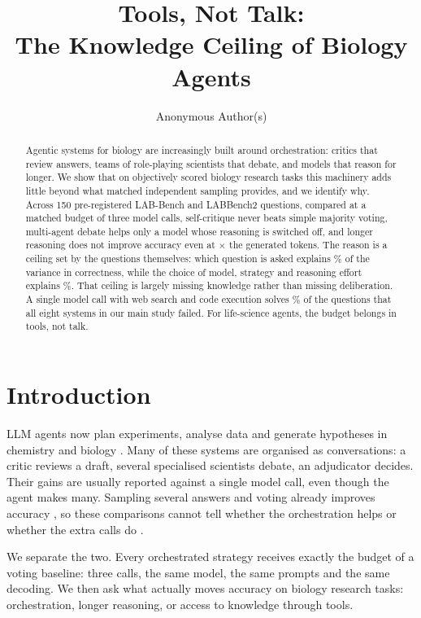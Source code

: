 \documentclass{article}
\title{Tools, Not Talk:\\The Knowledge Ceiling of Biology Agents}
\author{Anonymous Author(s)}
\begin{document}
\maketitle

\begin{abstract}
Agentic systems for biology are increasingly built around orchestration: critics that review answers, teams of role-playing scientists that debate, and models that reason for longer.
We show that on objectively scored biology research tasks this machinery adds little beyond what matched independent sampling provides, and we identify why.
Across 150 pre-registered LAB-Bench and LABBench2 questions, compared at a matched budget of three model calls, self-critique never beats simple majority voting, multi-agent debate helps only a model whose reasoning is switched off, and longer reasoning does not improve accuracy even at \TokRatioOSS$\times$ the generated tokens.
The reason is a ceiling set by the questions themselves: which question is asked explains \ItemShareMain\% of the variance in correctness, while the choice of model, strategy and reasoning effort explains \ArmShareMain\%.
That ceiling is largely missing knowledge rather than missing deliberation.
A single model call with web search and code execution solves \ToolsYesUnsolved\% of the questions that all eight systems in our main study failed.
For life-science agents, the budget belongs in tools, not talk.
\end{abstract}

\section{Introduction}
LLM agents now plan experiments, analyse data and generate hypotheses in chemistry and biology \citep{boiko2023coscientist,bran2023chemcrow,swanson2024virtuallab,huang2025biomni,gottweis2026coscientist,ghareeb2026robin}.
Many of these systems are organised as conversations: a critic reviews a draft, several specialised scientists debate, an adjudicator decides.
Their gains are usually reported against a single model call, even though the agent makes many.
Sampling several answers and voting already improves accuracy \citep{wang2022selfconsistency,li2024moreagents,brown2024monkeys}, so these comparisons cannot tell whether the orchestration helps or whether the extra calls do \citep{kapoor2024agentsmatters}.

We separate the two.
Every orchestrated strategy receives exactly the budget of a voting baseline: three calls, the same model, the same prompts and the same decoding.
We then ask what actually moves accuracy on biology research tasks: orchestration, longer reasoning, or access to knowledge through tools.
\end{document}
